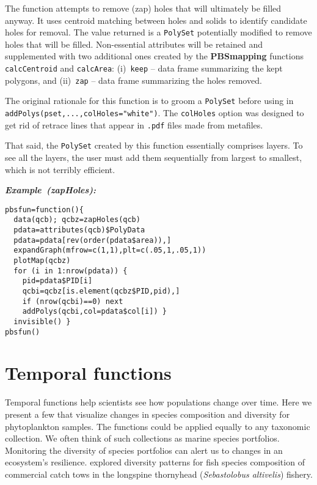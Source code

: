 \documentclass[letterpaper,12pt,fleqn]{article}
\def\tab{\hspace{0.5 in}}
\newcommand{\code}[1]{\small\texttt{#1}\normalsize}
\newcommand{\pkg}[1]{{\bf #1}}
\newcommand\example[1]{    %
	\textbf{\emph{Example~(#1):}}\\ \vspace{3 pt}
}
\begin{document}
\tab The function attempts to remove (zap) holes that will ultimately be filled anyway. It uses centroid matching between holes and solids to identify candidate holes for removal.  The value returned is a \code{PolySet} potentially modified to remove holes that will be filled. Non-essential attributes will be retained and supplemented with two additional ones created by the \pkg{PBSmapping} functions \code{calcCentroid} and \code{calcArea}: (i)~\code{keep} -- data frame summarizing the kept polygons, and (ii)~\code{zap} -- data frame summarizing the holes removed.

\tab The original rationale for this function is to groom a \code{PolySet} before using in \\
\code{addPolys(pset,...,colHoles="white")}. 
The \code{colHoles} option was designed to get rid of retrace lines that appear in \code{.pdf} files made from metafiles.

\tab That said, the \code{PolySet} created by this function essentially comprises layers. To see all the layers, the user must add them sequentially from largest to smallest, which is not terribly efficient.

\begin{examplebox}
\example{zapHoles}
\begin{Verbatim}[fontsize=\footnotesize]
pbsfun=function(){
  data(qcb); qcbz=zapHoles(qcb)
  pdata=attributes(qcb)$PolyData
  pdata=pdata[rev(order(pdata$area)),]
  expandGraph(mfrow=c(1,1),plt=c(.05,1,.05,1))
  plotMap(qcbz)
  for (i in 1:nrow(pdata)) {
    pid=pdata$PID[i]
    qcbi=qcbz[is.element(qcbz$PID,pid),]
    if (nrow(qcbi)==0) next
    addPolys(qcbi,col=pdata$col[i]) }
  invisible() }
pbsfun()
\end{Verbatim}
\end{examplebox}

\clearpage  %

\section {Temporal functions}

\tab Temporal functions help scientists see how populations change over time. Here we present a few that visualize changes in species composition and diversity for phytoplankton samples. The functions could be applied equally to any taxonomic collection. We often think of such collections as marine species portfolios. Monitoring the diversity of species portfolios can alert us to changes in an ecosystem's resilience. \citet{Haigh-Schnute:2003} explored diversity patterns for fish species composition of commercial catch tows in the longspine thornyhead (\emph{Sebastolobus altivelis}) fishery.
\end{document}
